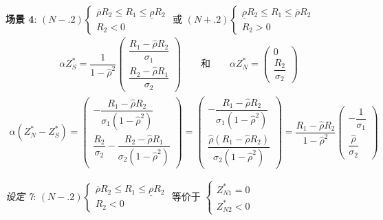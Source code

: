 \documentclass[10.0pt]{article}
\begin{document}
{\bf 场景 4}: $ (N-.2) \left\{ \begin{matrix} \overline{\rho} R_2 \leqslant R_1 \leqslant \underline{\rho} R_2 \\ R_2 < 0 \end{matrix} \right. $ 或 $ (N+.2) \left\{ \begin{matrix} \underline{\rho} R_2 \leqslant R_1 \leqslant \overline{\rho} R_2 \\ R_2 > 0 \end{matrix} \right. $
\begin{eqnarray*}
\alpha Z_S^* = \dfrac1{1 - {\hat \rho}^2} \left( \begin{matrix} \dfrac{R_1 - {\hat \rho} R_2}{\sigma_1} \\ \dfrac{R_2 - {\hat \rho} R_1}{\sigma_2} \end{matrix} \right) \qquad \text{和} \qquad \alpha Z_N^* = \left( \begin{matrix} 0 \\ \dfrac{R_2}{\sigma_2} \end{matrix} \right)
\end{eqnarray*}
\begin{eqnarray*}
\alpha (Z_N^* - Z_S^*) = \left( \begin{matrix} - \dfrac{R_1 - {\hat \rho} R_2}{\sigma_1 (1 - {\hat \rho}^2)} \\ \dfrac{R_2}{\sigma_2} - \dfrac{R_2 - {\hat \rho} R_1}{\sigma_2 (1 - {\hat \rho}^2)} \end{matrix} \right) = \left( \begin{matrix} - \dfrac{R_1 - {\hat \rho} R_2}{\sigma_1 (1 - {\hat \rho}^2)} \\ \dfrac{{\hat \rho} (R_1 - {\hat \rho} R_2)}{\sigma_2 (1 - {\hat \rho}^2)} \end{matrix} \right) = \dfrac{R_1 - {\hat \rho} R_2}{1 - {\hat \rho}^2} \left( \begin{matrix} - \dfrac{1}{\sigma_1} \\ \dfrac{{\hat \rho}}{\sigma_2} \end{matrix} \right)
\end{eqnarray*}

{\it 设定 7}: $ (N-.2) \left\{ \begin{matrix} \overline{\rho} R_2 \leqslant R_1 \leqslant \underline{\rho} R_2 \\ R_2 < 0 \end{matrix} \right. $ 等价于 $ \left\{ \begin{matrix} Z_{N 1}^* = 0 \\ Z_{N 2}^* < 0 \end{matrix} \right. $
\end{document}
